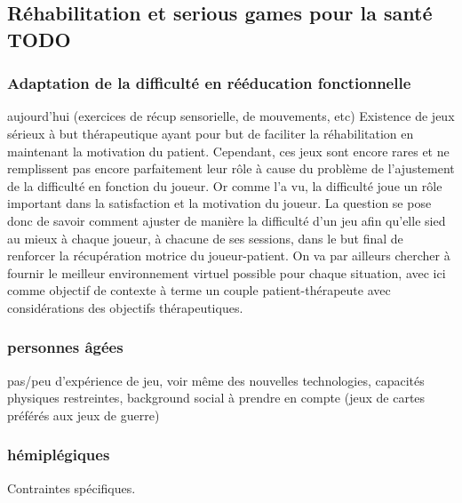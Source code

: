 \subsection{Réhabilitation et serious games pour la santé TODO}

		\subsubsection{Adaptation de la difficulté en rééducation fonctionnelle }
		aujourd'hui (exercices de récup sensorielle, de mouvements, etc)
Existence de jeux sérieux à but thérapeutique ayant pour but de faciliter la réhabilitation en maintenant la motivation du patient. Cependant, ces jeux sont encore rares et ne remplissent pas encore parfaitement leur rôle à cause du problème de l'ajustement de la difficulté en fonction du joueur.
Or comme l'a vu, la difficulté joue un rôle important dans la satisfaction et la motivation du joueur. La question se pose donc de savoir comment ajuster de manière la difficulté d'un jeu afin qu'elle sied au mieux à chaque joueur, à chacune de ses sessions, dans le but final de renforcer la récupération motrice du joueur-patient. On va par ailleurs chercher à fournir le meilleur environnement virtuel possible pour chaque situation, avec ici comme objectif de contexte à terme un couple patient-thérapeute avec considérations des objectifs thérapeutiques. 
		
		\subsubsection{personnes âgées}
pas/peu d'expérience de jeu, voir même des nouvelles technologies, capacités physiques restreintes, background social à prendre en compte (jeux de cartes préférés aux jeux de guerre)
		\subsubsection{hémiplégiques}		
Contraintes spécifiques.  